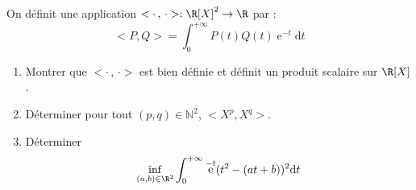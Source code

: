 \documentclass[a4paper,twoside,french,11pt]{VcCours}
\DeclareMathOperator{\e}{e}
\newcommand{\dt}{\text{d}t}
\begin{document}
\begin{Exercice}{} On définit une application $< \cdot \, , \, \cdot> : \R[X]^2 \rightarrow \R$ par :
  \[
 <P,Q> = \int_{0}^{ + \infty} P(t)Q(t)\e^{ - t} \dt
  \]
  \begin{enumerate}
  \item Montrer que $< \cdot \, , \, \cdot>$ est bien définie et définit un produit scalaire sur $\R[X]$.
  \item Déterminer pour tout $(p,q) \in \mathbb{N}^2$, $<X^{p} ,X^{q}>$.
  \item Déterminer
    \[
    \inf_{(a,b) \in \R^{2}} \int_{0}^{ + \infty} \e^{ - t}(t^{2} - (at + b))^{2} \dt
    \]
  \end{enumerate}
\end{Exercice}

%
%
%
%
%
%
%
\end{document}
